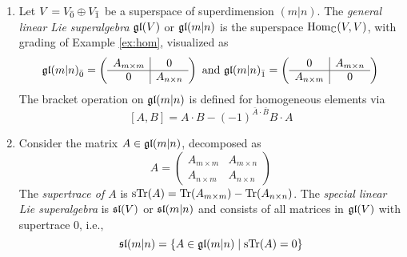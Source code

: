 \begin{example}
  \begin{enumerate}
    \item Let $V = \even{V} \oplus \odd{V}$ be a superspace of superdimension $(m|n)$. The \emph{general linear Lie superalgebra} $\gl(V)$ or $\gl(m|n)$ is the superspace $\Hom_\CC(V,V)$, with grading of Example \ref{ex:hom}, visualized as
  \[
    \even{\gl(m|n)} =
    \left(
      \begin{array}{c|c}
        A_{m \times m} & 0 \\
        \hline
        0 & A_{n \times n}
      \end{array}
    \right)
    \text{ and }
    \odd{\gl(m|n)} =
    \left(
      \begin{array}{c|c}
        0 & A_{m \times n} \\
        \hline
        A_{n \times m} & 0
      \end{array}
    \right)
  \]
  The bracket operation on $\gl(m|n)$ is defined for homogeneous elements via
  \[
    [A,B] = A \cdot B - (-1)^{\bar A \cdot \bar B} B \cdot A
  \]
  \item Consider the matrix $A \in \gl(m|n)$, decomposed as
  \[
    A = 
    \left(
      \begin{array}{c|c}
        A_{m \times m} & A_{m \times n} \\
        \hline
        A_{n \times m} & A_{n \times n}
      \end{array}
    \right)
  \]
  The \emph{supertrace of $A$} is $\sTr(A) = \Tr(A_{m \times m}) - \Tr(A_{n \times n})$. The \emph{special linear Lie superalgebra} is $\sl(V)$ or $\sl(m|n)$ and consists of all matrices in $\gl(V)$ with supertrace 0, i.e.,
  \[
    \sl(m|n) = \left\{ A \in \gl(m|n) \mid \sTr(A) = 0 \right\}
  \]
\end{enumerate}
\end{example}

